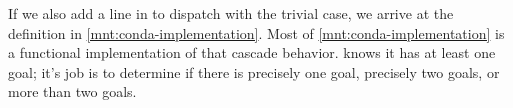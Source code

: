 \documentclass[sigplan,balance=true,pbalance=true,natbib=false]{acmart}
\begin{document}
If we also add a line in  to dispatch with the
trivial case, we arrive at the definition in
\cref{mnt:conda-implementation}. Most of
\cref{mnt:conda-implementation} is a functional implementation of that
cascade behavior.  knows it has at least one goal; it's
job is to determine if there is precisely one goal, precisely two
goals, or more than two goals.
\end{document}
